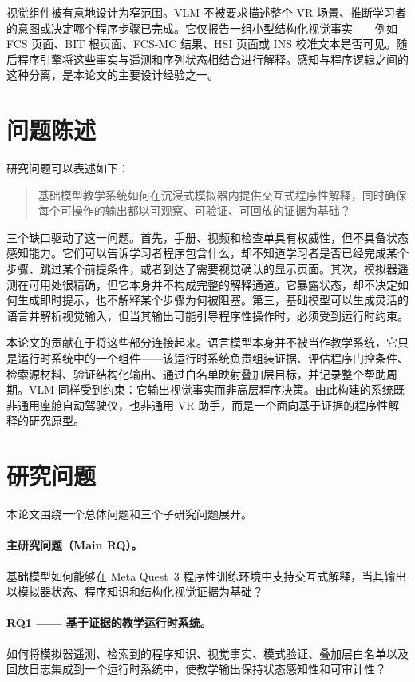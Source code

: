 视觉组件被有意地设计为窄范围。VLM 不被要求描述整个 VR 场景、推断学习者的意图或决定哪个程序步骤已完成。它仅报告一组小型结构化视觉事实——例如 FCS 页面、BIT 根页面、FCS-MC 结果、HSI 页面或 INS 校准文本是否可见。随后程序引擎将这些事实与遥测和序列状态相结合进行解释。感知与程序逻辑之间的这种分离，是本论文的主要设计经验之一。

\section{问题陈述}\label{sec:intro-problem}

研究问题可以表述如下：

\begin{quote}
基础模型教学系统如何在沉浸式模拟器内提供交互式程序性解释，同时确保每个可操作的输出都以可观察、可验证、可回放的证据为基础？
\end{quote}

三个缺口驱动了这一问题。首先，手册、视频和检查单具有权威性，但不具备状态感知能力。它们可以告诉学习者程序包含什么，却不知道学习者是否已经完成某个步骤、跳过某个前提条件，或者到达了需要视觉确认的显示页面。其次，模拟器遥测在可用处很精确，但它本身并不构成完整的解释通道。它暴露状态，却不决定如何生成即时提示，也不解释某个步骤为何被阻塞。第三，基础模型可以生成灵活的语言并解析视觉输入，但当其输出可能引导程序性操作时，必须受到运行时约束。

本论文的贡献在于将这些部分连接起来。语言模型本身并不被当作教学系统，它只是运行时系统中的一个组件——该运行时系统负责组装证据、评估程序门控条件、检索源材料、验证结构化输出、通过白名单映射叠加层目标，并记录整个帮助周期。VLM 同样受到约束：它输出视觉事实而非高层程序决策。由此构建的系统既非通用座舱自动驾驶仪，也非通用 VR 助手，而是一个面向基于证据的程序性解释的研究原型。

\section{研究问题}\label{sec:intro-rq}

本论文围绕一个总体问题和三个子研究问题展开。

\paragraph{主研究问题（Main RQ）。}
基础模型如何能够在 Meta Quest~3 程序性训练环境中支持交互式解释，当其输出以模拟器状态、程序知识和结构化视觉证据为基础？

\paragraph{RQ1 —— 基于证据的教学运行时系统。}
如何将模拟器遥测、检索到的程序知识、视觉事实、模式验证、叠加层白名单以及回放日志集成到一个运行时系统中，使教学输出保持状态感知性和可审计性？

